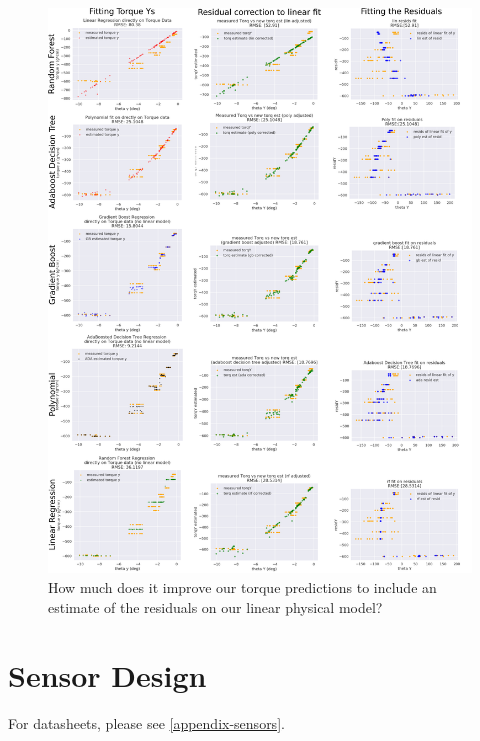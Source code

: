 \documentclass[preprint,12pt,3p]{elsarticle}
\begin{document}
\begin{figure}[H]
\centering
\includegraphics[width=\textwidth]{images/residcorrect/layout_vertical.png}
\caption{How much does it improve our torque predictions to include an estimate of the residuals on
our linear physical model?}
\end{figure}

\section{Sensor Design}

For datasheets, please see \ref{appendix-sensors}.
\end{document}
